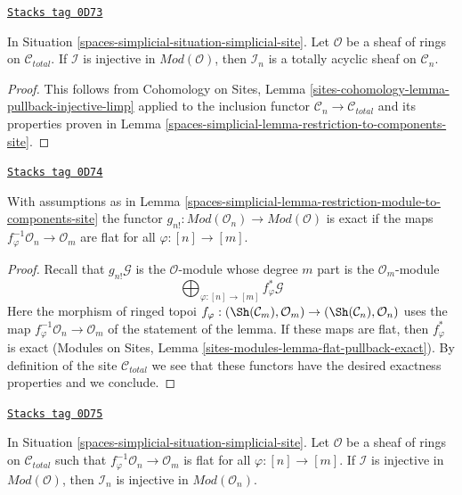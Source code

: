 \begin{lemma}
\label{spaces-simplicial-lemma-restriction-injective-to-component-limp}
\href{https://stacks.math.columbia.edu/tag/0D73}{\texttt{Stacks tag 0D73}}

In Situation \ref{spaces-simplicial-situation-simplicial-site}.
Let $\mathcal{O}$ be a sheaf of rings on $\mathcal{C}_{total}$.
If $\mathcal{I}$ is injective in $\textit{Mod}(\mathcal{O})$, then
$\mathcal{I}_n$ is a totally acyclic sheaf on $\mathcal{C}_n$.
\end{lemma}

\begin{proof}
This follows from
Cohomology on Sites, Lemma \ref{sites-cohomology-lemma-pullback-injective-limp}
applied to the inclusion functor $\mathcal{C}_n \to \mathcal{C}_{total}$
and its properties proven in Lemma \ref{spaces-simplicial-lemma-restriction-to-components-site}.
\end{proof}

\begin{lemma}
\label{spaces-simplicial-lemma-exactness-g-shriek-modules}
\href{https://stacks.math.columbia.edu/tag/0D74}{\texttt{Stacks tag 0D74}}

With assumptions as in
Lemma \ref{spaces-simplicial-lemma-restriction-module-to-components-site} the functor
$g_{n!} : \textit{Mod}(\mathcal{O}_n) \to \textit{Mod}(\mathcal{O})$
is exact if the maps $f_\varphi^{-1}\mathcal{O}_n \to \mathcal{O}_m$
are flat for all $\varphi : [n] \to [m]$.
\end{lemma}

\begin{proof}
Recall that $g_{n!}\mathcal{G}$ is the $\mathcal{O}$-module
whose degree $m$ part is the $\mathcal{O}_m$-module
$$
\bigoplus\nolimits_{\varphi : [n] \to [m]} f_\varphi^*\mathcal{G}
$$
Here the morphism of ringed topoi
$f_\varphi : (\Sh(\mathcal{C}_m), \mathcal{O}_m) \to
(\Sh(\mathcal{C}_n), \mathcal{O}_n)$ uses the map
$f_\varphi^{-1}\mathcal{O}_n \to \mathcal{O}_m$ of the
statement of the lemma. If these maps are flat, then
$f_\varphi^*$ is exact
(Modules on Sites, Lemma \ref{sites-modules-lemma-flat-pullback-exact}).
By definition of the site $\mathcal{C}_{total}$ we see that these
functors have the desired exactness properties and we conclude.
\end{proof}

\begin{lemma}
\label{spaces-simplicial-lemma-restriction-injective-to-component-site-module}
\href{https://stacks.math.columbia.edu/tag/0D75}{\texttt{Stacks tag 0D75}}

In Situation \ref{spaces-simplicial-situation-simplicial-site}.
Let $\mathcal{O}$ be a sheaf of rings on $\mathcal{C}_{total}$
such that $f_\varphi^{-1}\mathcal{O}_n \to \mathcal{O}_m$
is flat for all $\varphi : [n] \to [m]$.
If $\mathcal{I}$ is injective in $\textit{Mod}(\mathcal{O})$, then
$\mathcal{I}_n$ is injective in $\textit{Mod}(\mathcal{O}_n)$.
\end{lemma}

